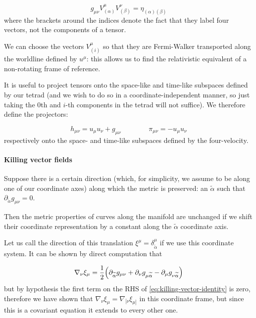 \documentclass[main.tex]{subfiles}
\begin{document}
\begin{equation}
    g_{\mu\nu} V^\mu _{(\alpha)} V^\nu _{(\beta)} = \eta_{(\alpha) (\beta)}
\end{equation}
where the brackets around the indices denote the fact that they label four vectors, not the components of a tensor.

We can choose the vectors \(V_{(i)}^\mu\) so that they are Fermi-Walker transported along the worldline defined by \(u^\mu\): this allows us to find the relativistic equivalent of a non-rotating frame of reference.

It is useful to project tensors onto the space-like and time-like subspaces defined by our tetrad (and we wish to do so in a coordinate-independent manner,  so just taking the 0th and $i $-th components in the tetrad will not suffice). We therefore define the projectors:

\begin{equation}
    h_{\mu \nu} = u_\mu u_\nu + g_{\mu \nu} \qquad \qquad \pi_{\mu\nu} = -u_\mu u_\nu
\end{equation}
respectively onto the space- and time-like subspaces defined by the four-velocity.

\paragraph{Killing vector fields}

Suppose there is a certain direction (which, for simplicity, we assume to be along one of our coordinate axes) along which the metric is preserved: an \(\widetilde{\alpha}\) such that \(\partial_{\widetilde{\alpha}} g_{\mu\nu} =0\).

Then the metric properties of curves along the manifold are unchanged if we shift their coordinate representation by a constant along the \(\widetilde{\alpha}\) coordinate axis.

Let us call the direction of this translation \(\xi^\mu = \delta^\mu_{\widetilde{\alpha}}\) if we use this coordinate system. It can be shown by direct computation that

\begin{equation} \label{eq:killing-vector-identity}
    \nabla_{\nu} \xi_\mu = \frac{1}{2} \qty(\partial_{\widetilde{\alpha}}
    g_{\mu\nu} + \partial_\nu g_{\mu\widetilde{\alpha}} -
    \partial_\mu g_{\nu \widetilde{\alpha}})
\end{equation}
but by hypothesis the first term on the RHS of \eqref{eq:killing-vector-identity} is zero, therefore we have shown that \(\nabla_{\nu} \xi_\mu = \nabla_{[\nu} \xi_{\mu]}\) in this coordinate frame, but since this is a covariant equation it extends to every other one.
\end{document}
